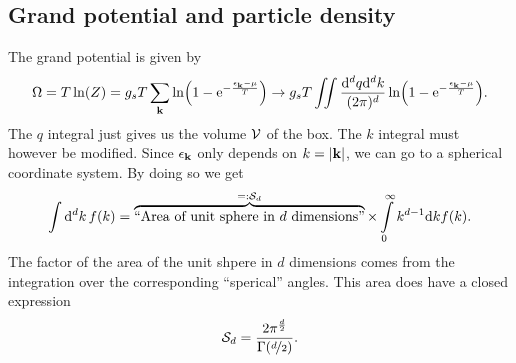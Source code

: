 \documentclass[11pt,letter, swedish, english
]{article}
\begin{document}
\subsection{Grand potential and particle density}
The grand potential is given by
\begin{equation}
\Omega=T\ln(Z)=g_sT\sum_{\vb{k}}
\ln(1-\mathrm{e}^{-\frac{\epsilon_{\vb{k}}-\mu}{T}})
\to g_sT
\iint\frac{\mathrm{d}^dq\mathrm{d}^dk}{(2\pi)^d}\ln(1-\mathrm{e}^{-\frac{\epsilon_{\vb{k}}-\mu}{T}}).
\end{equation}
The $q$ integral just gives us the volume $\mathcal{V}$ of the box. The $k$
integral must however be modified. Since $\epsilon_{\vb{k}}$ only
depends on $k=|\vb{k}|$, we can go to a spherical coordinate
system. By doing so we get
\vspace{-4mm}\begin{equation}
\int\rd^dk\,f(k)
=\overbrace{\text{``Area of unit sphere in $d$ dimensions''}}^{=:\Sd}
\times\int_0^\infty k^{d-1}\rd{k}f(k).
\end{equation}
The factor of the area of the unit shpere in $d$ dimensions comes from
the integration over the corresponding ``sperical'' angles. This area
does have a closed expression
\begin{equation}\label{eq:4_Sd}
\mathcal{S}_d=\frac{2\pi^{\frac{d}{2}}}{\Gamma(\nicefrac{d}{2})}.
\end{equation}
\end{document}
